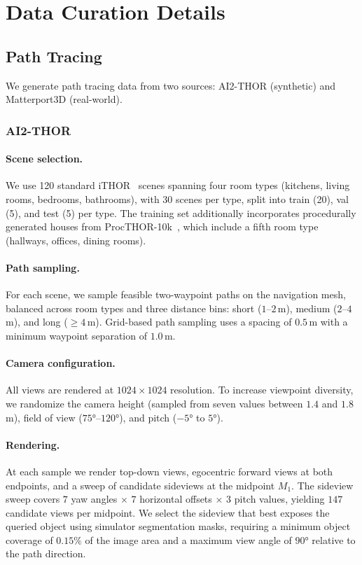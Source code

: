\section{Data Curation Details}
\label{supp_data}

\subsection{Path Tracing}
\label{supp_data_pt}

We generate path tracing data from two sources: AI2-THOR (synthetic) and Matterport3D (real-world).

\subsubsection{AI2-THOR}

\paragraph{Scene selection.}
We use 120 standard iTHOR~\cite{kolve2017ai2} scenes spanning four room types (kitchens, living rooms, bedrooms, bathrooms), with 30 scenes per type, split into train (20), val (5), and test (5) per type.
The training set additionally incorporates procedurally generated houses from ProcTHOR-10k~\cite{deitke2022procthor}, which include a fifth room type (hallways, offices, dining rooms).

\paragraph{Path sampling.}
For each scene, we sample feasible two-waypoint paths on the navigation mesh, balanced across room types and three distance bins: short ($1$--$2$\,m), medium ($2$--$4$\,m), and long (${\geq}4$\,m).
Grid-based path sampling uses a spacing of $0.5$\,m with a minimum waypoint separation of $1.0$\,m.

\paragraph{Camera configuration.}
All views are rendered at $1024 \times 1024$ resolution.
To increase viewpoint diversity, we randomize the camera height (sampled from seven values between $1.4$ and $1.8$\,m), field of view ($75°$--$120°$), and pitch ($-5°$ to $5°$).

\paragraph{Rendering.}
At each sample we render top-down views, egocentric forward views at both endpoints, and a sweep of candidate sideviews at the midpoint $M_1$.
The sideview sweep covers $7$ yaw angles $\times$ $7$ horizontal offsets $\times$ $3$ pitch values, yielding $147$ candidate views per midpoint.
We select the sideview that best exposes the queried object using simulator segmentation masks, requiring a minimum object coverage of $0.15\%$ of the image area and a maximum view angle of $90°$ relative to the path direction.

